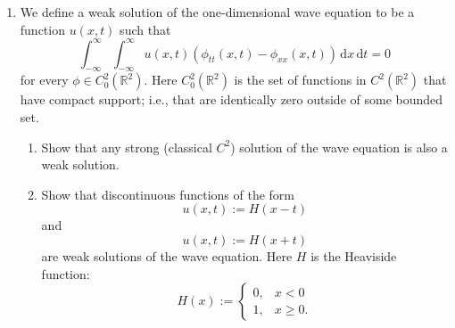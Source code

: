 \begin{enumerate}[label=\thesection.\arabic*.,ref=\thesection.\arabic*,start=25,series=book-problems]
\item\label{ex:discontinuous-weak-wave-solutions} We define a weak solution of the one-dimensional wave equation to be a function $u(x,t)$ such that
\begin{equation}\label{eq:wave-distributional-form}
\int_{-\infty}^{\infty}\int_{-\infty}^{\infty}u(x,t)(\phi_{tt}(x,t)-\phi_{xx}(x,t))\,\mathrm{d}x\,\mathrm{d}t=0
\end{equation}
for every $\phi\in C_0^2(\mathbb{R}^2)$. Here $C_0^2(\mathbb{R}^2)$ is the set of functions in $C^2(\mathbb{R}^2)$ that have compact support; i.e., that are identically zero outside of some bounded set.
\begin{enumerate}[label=(\alph*)]
\item Show that any strong (classical $C^2$) solution of the wave equation is also a weak solution.
\item Show that discontinuous functions of the form
\begin{equation}\label{eq:heaviside-right-moving-solution}
u(x,t):=H(x-t)
\end{equation}
and
\begin{equation}\label{eq:heaviside-left-moving-solution}
u(x,t):=H(x+t)
\end{equation}
are weak solutions of the wave equation. Here $H$ is the Heaviside function:
\begin{equation}\label{eq:heaviside-function}
H(x):=\begin{cases}0,&x<0\\1,&x\geq0.\end{cases}
\end{equation}
\end{enumerate}

\end{enumerate}
